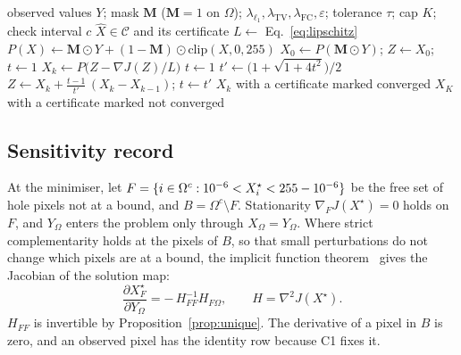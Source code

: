 \documentclass[final,3p]{elsarticle}
\begin{document}
\begin{algorithm}[htbp]
\caption{CSFR solver, as implemented in \texttt{src/\allowbreak csfr\allowbreak\_solver.py} (function \texttt{solve}). The patches of a batch are solved independently, and a converged patch is frozen.}
\label{alg:csfr}
\begin{algorithmic}[1]
\Require observed values $Y$; mask $\mathbf{M}$ ($\mathbf{M}=1$ on $\Omega$); $\lambda_{\ell_1}, \lambda_{\mathrm{TV}}, \lambda_{\mathrm{FC}}, \varepsilon$; tolerance $\tau$; cap $K$; check interval $c$
\Ensure $\hat{X} \in \mathcal{C}$ and its certificate
\State $L \gets$ Eq.~\eqref{eq:lipschitz}
\State $P(X) \gets \mathbf{M}\odot Y + (1-\mathbf{M})\odot\mathrm{clip}(X, 0, 255)$ 
\State $X_{0} \gets P(\mathbf{M}\odot Y)$; \; $Z \gets X_{0}$; \; $t \gets 1$
  \State $X_{k} \gets P\bigl(Z - \nabla J(Z)/L\bigr)$
    \State $t \gets 1$ 
  \EndIf
  \State $t' \gets \bigl(1 + \sqrt{1 + 4t^{2}}\bigr)/2$
  \State $Z \gets X_{k} + \tfrac{t-1}{t'}\,(X_{k} - X_{k-1})$; \; $t \gets t'$
     
      \State \Return $X_{k}$ with a certificate marked converged
    \EndIf
  \EndIf
\EndFor
\State \Return $X_{K}$ with a certificate marked not converged
\end{algorithmic}
\end{algorithm}

\subsection{Sensitivity record}
\label{sec:framework:audit}

At the minimiser, let $F = \{ i \in \Omega^{c} : 10^{-6} < X^{\star}_{i} < 255 - 10^{-6} \}$ be the free set of hole pixels not at a bound, and $B = \Omega^{c} \setminus F$. Stationarity $\nabla_{F} J(X^{\star}) = 0$ holds on $F$, and $Y_{\Omega}$ enters the problem only through $X_{\Omega} = Y_{\Omega}$. Where strict complementarity holds at the pixels of $B$, so that small perturbations do not change which pixels are at a bound, the implicit function theorem~\cite{dontchev2014implicit} gives the Jacobian of the solution map:
\begin{equation}
\label{eq:record}
\frac{\partial X^{\star}_{F}}{\partial Y_{\Omega}} = -\,H_{FF}^{-1} H_{F\Omega}, \qquad H = \nabla^{2} J(X^{\star}).
\end{equation}
$H_{FF}$ is invertible by Proposition~\ref{prop:unique}. The derivative of a pixel in $B$ is zero, and an observed pixel has the identity row because C1 fixes it.
\end{document}
